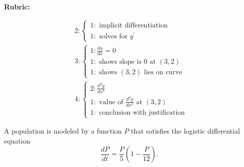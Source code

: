 \documentclass[12pt,addpoints,answers]{exam}
\begin{document}
\begin{questions}
\begin{solution}
\par\medskip
\textbf{Rubric:}\par
\[\begin{aligned}
& 2:\left\{\begin{array}{l}
1: \text { implicit differentiation } \\
1: \text { solves for } y^{\prime}
\end{array}\right. \\
& 3:\left\{\begin{array}{l}
1: \frac{d y}{d x}=0 \\
1: \text { shows slope is } 0 \text { at }(3,2) \\
1: \text { shows }(3,2) \text { lies on curve }
\end{array}\right. \\
& 4:\left\{\begin{array}{l}
2: \frac{d^{2} y}{d x^{2}} \\
1: \text { value of } \frac{d^{2} y}{d x^{2}} \text { at }(3,2) \\
1: \text { conclusion with justification }
\end{array}\right.
\end{aligned}\]
\end{solution}

\question
A population is modeled by a function $P$ that satisfies the logistic differential equation
\[\frac{d P}{d t}=\frac{P}{5}\left(1-\frac{P}{12}\right) .\]
\end{questions}
\end{document}

